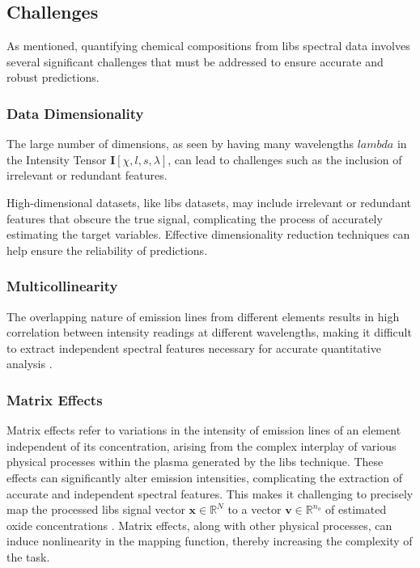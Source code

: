 \subsection{Challenges}
As mentioned, quantifying chemical compositions from \gls{libs} spectral data involves several significant challenges that must be addressed to ensure accurate and robust predictions.

\subsubsection{Data Dimensionality}
The large number of dimensions, as seen by having many wavelengths $lambda$ in the Intensity Tensor $\mathbf{I}[\chi, l, s, \lambda]$, can lead to challenges such as the inclusion of irrelevant or redundant features.

High-dimensional datasets, like \gls{libs} datasets, may include irrelevant or redundant features that obscure the true signal, complicating the process of accurately estimating the target variables. Effective dimensionality reduction techniques can help ensure the reliability of predictions.

\subsubsection{Multicollinearity}
The overlapping nature of emission lines from different elements results in high correlation between intensity readings at different wavelengths, making it difficult to extract independent spectral features necessary for accurate quantitative analysis \cite{andersonImprovedAccuracyQuantitative2017}.

\subsubsection{Matrix Effects}
Matrix effects refer to variations in the intensity of emission lines of an element independent of its concentration, arising from the complex interplay of various physical processes within the plasma generated by the \gls{libs} technique. These effects can significantly alter emission intensities, complicating the extraction of accurate and independent spectral features. This makes it challenging to precisely map the processed \gls{libs} signal vector $\mathbf{x} \in \mathbb{R}^N$ to a vector $\mathbf{v} \in \mathbb{R}^{n_o}$ of estimated oxide concentrations \cite{cleggRecalibrationMarsScience2017, andersonImprovedAccuracyQuantitative2017}.
Matrix effects, along with other physical processes, can induce nonlinearity in the mapping function, thereby increasing the complexity of the task\cite{liuRecentAdvancesMachine2024}.

